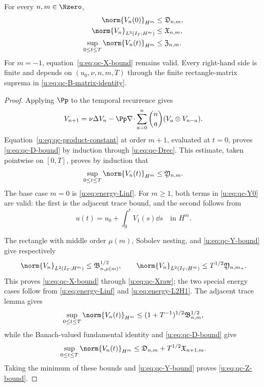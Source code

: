 \begin{lemma}
\label{u:lem:qc-closed-velocity-majorants}
For every \(n,m\in\Nzero\),
\begin{align}
 \norm{V_n(0)}_{H^m}&\le\mathfrak D_{n,m},
 \label{u:eq:qc-D-bound}\\
 \norm{V_n}_{L^2(I_T;H^m)}&\le\mathfrak X_{n,m},
 \label{u:eq:qc-X-bound}\\
 \sup_{0\le t\le T}\norm{V_n(t)}_{H^m}
 &\le\mathfrak Z_{n,m}.
 \label{u:eq:qc-Z-bound}
\end{align}
For \(m=-1\), equation~\eqref{u:eq:qc-X-bound} remains valid.  Every
right-hand side is finite and depends on \((u_0,\nu,n,m,T)\) through the
finite rectangle-matrix suprema in \eqref{u:eq:qc-B-matrix-identity}.
\end{lemma}

\begin{proof}
Applying \(\Pp\) to the temporal recurrence gives
\begin{equation}
 V_{n+1}=\nu\Delta V_n
 -\Pp\nabla\!\cdot\sum_{a=0}^{n}\binom na
 (V_a\otimes V_{n-a}).
 \label{u:eq:qc-projected-temporal-recurrence}
\end{equation}
Equation~\eqref{u:eq:qc-product-constant} at order \(m+1\), evaluated at
\(t=0\), proves \eqref{u:eq:qc-D-bound} by induction through
\eqref{u:eq:qc-Drec}.  This estimate, taken pointwise on \([0,T]\),
proves by induction that
\begin{equation}
 \sup_{0\le t\le T}\norm{V_n(t)}_{H^m}
 \le\mathfrak Y_{n,m}.
 \label{u:eq:qc-Y-bound}
\end{equation}
The base case \(m=0\) is \eqref{u:eq:energy-Linf}.  For \(m\ge1\), both
terms in \eqref{u:eq:qc-Y0} are valid: the first is the adjacent trace bound,
and the second follows from
\[
 u(t)=u_0+\int_0^tV_1(s)\dd s
 \quad\text{in }H^m.
\]

The rectangle with middle order \(\mu(m)\), Sobolev nesting, and
\eqref{u:eq:qc-Y-bound} give respectively
\[
 \norm{V_n}_{L^2(I_T;H^m)}
 \le\mathfrak B_{n,\mu(m)}^{1/2},
 \qquad
 \norm{V_n}_{L^2(I_T;H^m)}
 \le T^{1/2}\mathfrak Y_{n,m_+}.
\]
This proves \eqref{u:eq:qc-X-bound} through \eqref{u:eq:qc-Xraw}; the two
special energy cases follow from \eqref{u:eq:energy-Linf} and
\eqref{u:eq:energy-L2H1}.  The adjacent trace lemma gives
\[
 \sup_{0\le t\le T}\norm{V_n(t)}_{H^m}
 \le(1+T^{-1})^{1/2}\mathfrak B_{n,m}^{1/2},
\]
while the Banach-valued fundamental identity and
\eqref{u:eq:qc-D-bound} give
\[
 \sup_{0\le t\le T}\norm{V_n(t)}_{H^m}
 \le\mathfrak D_{n,m}+T^{1/2}\mathfrak X_{n+1,m}.
\]
Taking the minimum of these bounds and \eqref{u:eq:qc-Y-bound} proves
\eqref{u:eq:qc-Z-bound}.
\end{proof}


